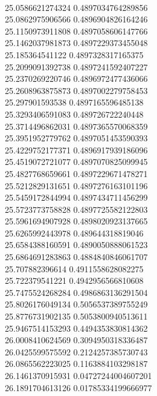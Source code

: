 { \\
25.0586621274324 0.4897034764289856
 \\
25.0862975906566 0.4896904826164246
 \\
25.1150973911808 0.4897058606147766
 \\
25.1462037981873 0.4897229373455048
 \\
25.185364541122 0.4897328317165375
 \\
25.2099091392738 0.4897241592407227
 \\
25.2370269220746 0.4896972477436066
 \\
25.2608963875873 0.4897002279758453
 \\
25.297901593538 0.4897165596485138
 \\
25.3293406591083 0.489726722240448
 \\
25.3714496862031 0.4897365570068359
 \\
25.3951952779762 0.4897051453590393
 \\
25.4229752177371 0.4896917939186096
 \\
25.4519072721077 0.4897070825099945
 \\
25.4827768659661 0.4897229671478271
 \\
25.5212829131651 0.4897276163101196
 \\
25.5459172844994 0.4897434711456299
 \\
25.5723773758828 0.4897725582122803
 \\
25.5961694907928 0.4898020923137665
 \\
25.6265992443978 0.489644318819046
 \\
25.6584388160591 0.4890050888061523
 \\
25.6864691283863 0.4884840846061707
 \\
25.707882396614 0.4911558628082275
 \\
25.722379541221 0.4942956566810608
 \\
25.7475524268284 0.4986863136291504
 \\
25.8026176049134 0.5056537389755249
 \\
25.8776731902135 0.5053800940513611
 \\
25.9467514153293 0.4494353830814362
 \\
26.0008410624569 0.3094950318336487
 \\
26.0425599575592 0.2124257385730743
 \\
26.0865562223025 0.1163884103298187
 \\
26.1461370915931 0.04727244004607201
 \\
26.1891704613126 0.01785334199666977
}
